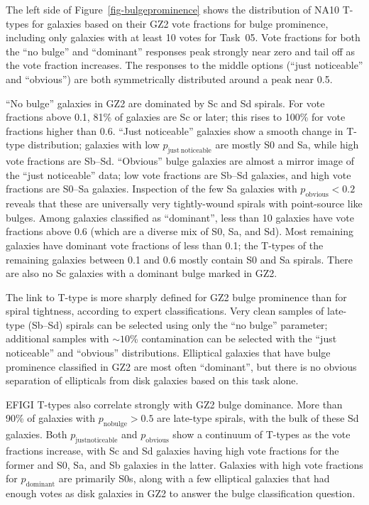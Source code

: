 \documentclass[useAMS,usenatbib]{mn2e}
\begin{document}
The left side of Figure~\ref{fig-bulgeprominence} shows the distribution of NA10 T-types for galaxies based on their GZ2 vote fractions for bulge prominence, including only galaxies with at least 10 votes for Task~05. Vote fractions for both the ``no bulge'' and ``dominant'' responses peak strongly near zero and tail off as the vote fraction increases. The responses to the middle options (``just noticeable'' and ``obvious'') are both symmetrically distributed around a peak near 0.5. 

``No bulge'' galaxies in GZ2 are dominated by Sc and Sd spirals. For vote fractions above 0.1, 81\% of galaxies are Sc or later; this rises to 100\% for vote fractions higher than 0.6. ``Just noticeable'' galaxies show a smooth change in T-type distribution; galaxies with low $p_\mathrm{just~noticeable}$ are mostly S0 and Sa, while high vote fractions are Sb--Sd. ``Obvious'' bulge galaxies are almost a mirror image of the ``just noticeable'' data; low vote fractions are Sb--Sd galaxies, and high vote fractions are S0--Sa galaxies. Inspection of the few Sa galaxies with $p_\mathrm{obvious}<0.2$ reveals that these are universally very tightly-wound spirals with point-source like bulges. Among galaxies classified as ``dominant'', less than 10 galaxies have vote fractions above 0.6 (which are a diverse mix of S0, Sa, and Sd). Most remaining galaxies have dominant vote fractions of less than 0.1; the T-types of the remaining galaxies between 0.1 and 0.6 mostly contain S0 and Sa spirals. There are also no Sc galaxies with a dominant bulge marked in GZ2. 

The link to T-type is more sharply defined for GZ2 bulge prominence than for spiral tightness, according to expert classifications. Very clean samples of late-type (Sb--Sd) spirals can be selected using only the ``no bulge'' parameter; additional samples with $\sim10$\% contamination can be selected with the ``just noticeable'' and ``obvious'' distributions. Elliptical galaxies that have bulge prominence classified in GZ2 are most often ``dominant'', but there is no obvious separation of ellipticals from disk galaxies based on this task alone. 

EFIGI T-types also correlate strongly with GZ2 bulge dominance. More than 90\% of galaxies with $p_\mathrm{no bulge}>0.5$ are late-type spirals, with the bulk of these Sd galaxies. Both $p_\mathrm{just noticeable}$ and $p_\mathrm{obvious}$ show a continuum of T-types as the vote fractions increase, with Sc and Sd galaxies having high vote fractions for the former and S0, Sa, and Sb galaxies in the latter. Galaxies with high vote fractions for $p_\mathrm{dominant}$ are primarily S0s, along with a few elliptical galaxies that had enough votes as disk galaxies in GZ2 to answer the bulge classification question. 
\end{document}
